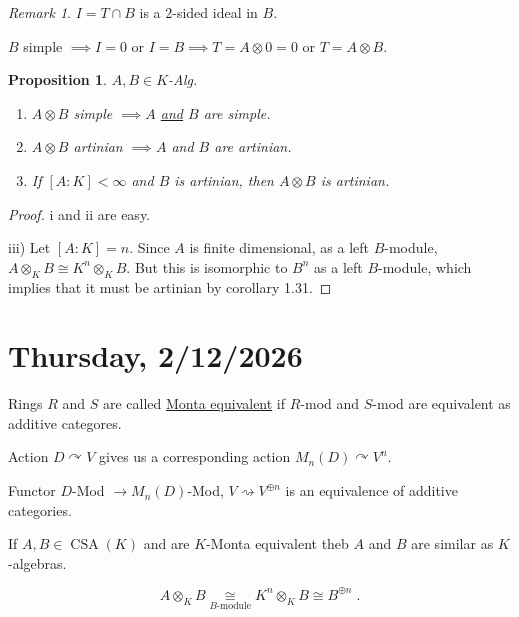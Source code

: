 \documentclass{article}
\theoremstyle{definition}
\theoremstyle{plain}
\newtheorem{proposition}[theorem]{Proposition}
\theoremstyle{remark}
\newtheorem*{remark*}{Remark}
\begin{document}
    \begin{remark*}
        \(I = T\cap B\) is a \(2\)-sided ideal in \(B\).

        \(B\) simple \(\implies I = 0\) or \(I = B \implies T = A \otimes 0 = 0\) or \(T = A \otimes B\). 
    \end{remark*}

    \begin{proposition}
        \(A, B \in K\)-Alg.

        \begin{enumerate}[label=\roman*)]
            \item \(A \otimes B\) simple \(\implies A\) \underline{and} \(B\) are simple.
            \item \(A \otimes B\) artinian \(\implies A\) and \(B\) are artinian.
            \item If \([A : K] < \infty\) and \(B\) is artinian, then \(A \otimes B\) is artinian. 
        \end{enumerate} 
    \end{proposition}

    \begin{proof}
        i and ii are easy.

        iii) Let \([A:K] = n\). Since \(A\) is finite dimensional, as a left \(B\)-module, \(A \otimes_K B \cong K^n \otimes_K B\). But this is isomorphic to \(B^n\) as a left \(B\)-module, which implies that it must be artinian by corollary 1.31. 
    \end{proof}
    
    \section*{Thursday, 2/12/2026}

    Rings \(R\) and \(S\) are called \underline{Monta equivalent} if \(R\)-mod and \(S\)-mod are equivalent as additive categores.

    Action \(D \curvearrowright V\) gives us a corresponding action \(M_n(D) \curvearrowright V^n\).
    
    Functor \(D\)-Mod \(\to M_n(D)\)-Mod, \(V \rightsquigarrow V^{\oplus n}\) is an equivalence of additive categories.
    
    If \(A, B \in \operatorname{CSA}(K)\) and are \(K\)-Monta equivalent theb \(A\) and \(B\) are similar as \(K\)-algebras.

    \[
        A \otimes_K B \underset{B\text{-module}}{\cong} K^n \otimes_K B \cong B^{\oplus n}\;.
    \]
    
\end{document}
